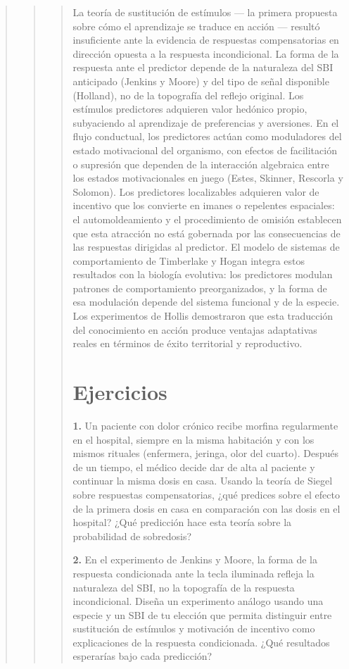 \documentclass[
  letterpaper,
  DIV=11,
  numbers=noendperiod]{scrreprt}
\begin{document}
\begin{tcolorbox}[enhanced jigsaw, arc=.35mm, bottomrule=.15mm, breakable, colback=white, colframe=quarto-callout-note-color-frame, left=2mm, leftrule=.75mm, opacityback=0, rightrule=.15mm, toprule=.15mm]
\begin{quote}
\begin{quote}
\begin{quote}
La teoría de sustitución de estímulos --- la primera propuesta sobre
cómo el aprendizaje se traduce en acción --- resultó insuficiente ante
la evidencia de respuestas compensatorias en dirección opuesta a la
respuesta incondicional. La forma de la respuesta ante el predictor
depende de la naturaleza del SBI anticipado (Jenkins y Moore) y del tipo
de señal disponible (Holland), no de la topografía del reflejo original.
Los estímulos predictores adquieren valor hedónico propio, subyaciendo
al aprendizaje de preferencias y aversiones. En el flujo conductual, los
predictores actúan como moduladores del estado motivacional del
organismo, con efectos de facilitación o supresión que dependen de la
interacción algebraica entre los estados motivacionales en juego (Estes,
Skinner, Rescorla y Solomon). Los predictores localizables adquieren
valor de incentivo que los convierte en imanes o repelentes espaciales:
el automoldeamiento y el procedimiento de omisión establecen que esta
atracción no está gobernada por las consecuencias de las respuestas
dirigidas al predictor. El modelo de sistemas de comportamiento de
Timberlake y Hogan integra estos resultados con la biología evolutiva:
los predictores modulan patrones de comportamiento preorganizados, y la
forma de esa modulación depende del sistema funcional y de la especie.
Los experimentos de Hollis demostraron que esta traducción del
conocimiento en acción produce ventajas adaptativas reales en términos
de éxito territorial y reproductivo.

\mbox{}%
\section{Ejercicios}\label{ejercicios-4}

\textbf{1.} Un paciente con dolor crónico recibe morfina regularmente en
el hospital, siempre en la misma habitación y con los mismos rituales
(enfermera, jeringa, olor del cuarto). Después de un tiempo, el médico
decide dar de alta al paciente y continuar la misma dosis en casa.
Usando la teoría de Siegel sobre respuestas compensatorias, ¿qué
predices sobre el efecto de la primera dosis en casa en comparación con
las dosis en el hospital? ¿Qué predicción hace esta teoría sobre la
probabilidad de sobredosis?

\textbf{2.} En el experimento de Jenkins y Moore, la forma de la
respuesta condicionada ante la tecla iluminada refleja la naturaleza del
SBI, no la topografía de la respuesta incondicional. Diseña un
experimento análogo usando una especie y un SBI de tu elección que
permita distinguir entre sustitución de estímulos y motivación de
incentivo como explicaciones de la respuesta condicionada. ¿Qué
resultados esperarías bajo cada predicción?


\end{quote}
\end{quote}
\end{quote}
\end{tcolorbox}
\end{document}
